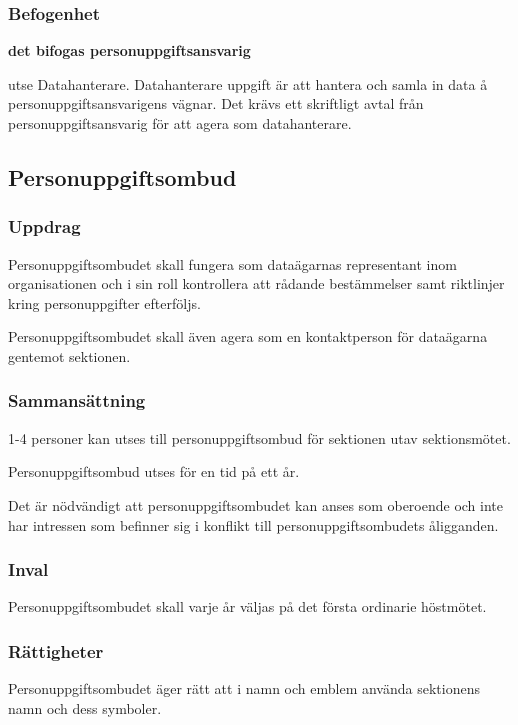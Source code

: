\subsubsection{Befogenhet}
\textbf{det bifogas personuppgiftsansvarig}
\begin{att}
    \item utse Datahanterare. Datahanterare uppgift är att hantera och samla in data å personuppgiftsansvarigens vägnar. Det krävs ett skriftligt avtal från personuppgiftsansvarig för att agera som datahanterare.
\end{att}

\subsection{Personuppgiftsombud}

\subsubsection{Uppdrag}
 Personuppgiftsombudet skall fungera som dataägarnas representant inom organisationen och i sin roll kontrollera att rådande bestämmelser samt riktlinjer kring personuppgifter efterföljs.
 
 Personuppgiftsombudet skall även agera som en kontaktperson för dataägarna gentemot sektionen.

\subsubsection{Sammansättning}
1-4 personer kan utses till personuppgiftsombud för sektionen utav sektionsmötet.

Personuppgiftsombud utses för en tid på ett år.

Det är nödvändigt att personuppgiftsombudet kan anses som oberoende och inte har intressen som befinner sig i konflikt till personuppgiftsombudets åligganden.

\subsubsection{Inval}
Personuppgiftsombudet skall varje år väljas på det första ordinarie höstmötet.

\subsubsection{Rättigheter}
Personuppgiftsombudet äger rätt att i namn och emblem använda sektionens namn
och dess symboler.

